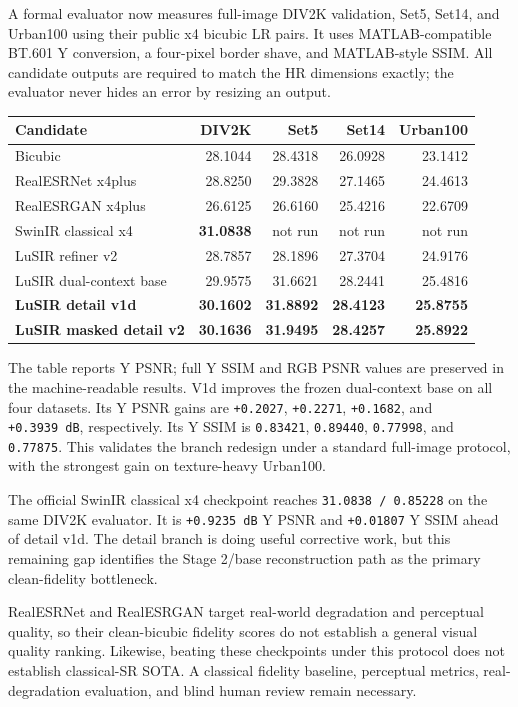 \documentclass[
  10pt,
]{article}
\begin{document}
A formal evaluator now measures full-image DIV2K validation, Set5,
Set14, and Urban100 using their public x4 bicubic LR pairs. It uses
MATLAB-compatible BT.601 Y conversion, a four-pixel border shave, and
MATLAB-style SSIM. All candidate outputs are required to match the HR
dimensions exactly; the evaluator never hides an error by resizing an
output.

\begin{longtable}[]{@{}lrrrr@{}}
\toprule\noalign{}
Candidate & DIV2K & Set5 & Set14 & Urban100 \\
\midrule\noalign{}
\endhead
\bottomrule\noalign{}
\endlastfoot
Bicubic & 28.1044 & 28.4318 & 26.0928 & 23.1412 \\
RealESRNet x4plus & 28.8250 & 29.3828 & 27.1465 & 24.4613 \\
RealESRGAN x4plus & 26.6125 & 26.6160 & 25.4216 & 22.6709 \\
SwinIR classical x4 & \textbf{31.0838} & not run & not run & not run \\
LuSIR refiner v2 & 28.7857 & 28.1896 & 27.3704 & 24.9176 \\
LuSIR dual-context base & 29.9575 & 31.6621 & 28.2441 & 25.4816 \\
\textbf{LuSIR detail v1d} & \textbf{30.1602} & \textbf{31.8892} &
\textbf{28.4123} & \textbf{25.8755} \\
\textbf{LuSIR masked detail v2} & \textbf{30.1636} & \textbf{31.9495} &
\textbf{28.4257} & \textbf{25.8922} \\
\end{longtable}

The table reports Y PSNR; full Y SSIM and RGB PSNR values are preserved
in the machine-readable results. V1d improves the frozen dual-context
base on all four datasets. Its Y PSNR gains are \texttt{+0.2027},
\texttt{+0.2271}, \texttt{+0.1682}, and \texttt{+0.3939\ dB},
respectively. Its Y SSIM is \texttt{0.83421}, \texttt{0.89440},
\texttt{0.77998}, and \texttt{0.77875}. This validates the branch
redesign under a standard full-image protocol, with the strongest gain
on texture-heavy Urban100.

The official SwinIR classical x4 checkpoint reaches
\texttt{31.0838\ /\ 0.85228} on the same DIV2K evaluator. It is
\texttt{+0.9235\ dB} Y PSNR and \texttt{+0.01807} Y SSIM ahead of detail
v1d. The detail branch is doing useful corrective work, but this
remaining gap identifies the Stage 2/base reconstruction path as the
primary clean-fidelity bottleneck.

RealESRNet and RealESRGAN target real-world degradation and perceptual
quality, so their clean-bicubic fidelity scores do not establish a
general visual quality ranking. Likewise, beating these checkpoints
under this protocol does not establish classical-SR SOTA. A classical
fidelity baseline, perceptual metrics, real-degradation evaluation, and
blind human review remain necessary.
\end{document}
